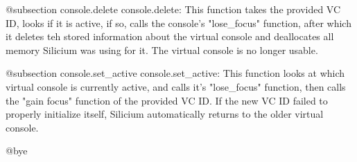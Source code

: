 @subsection console.delete
console.delete:
This function takes the provided VC ID, looks if it is active, if so, calls the
console's "lose_focus" function, after which it deletes teh stored information about the virtual console and deallocates all memory Silicium was using for it.
The virtual console is no longer usable.

@subsection console.set_active
console.set_active:
This function looks at which virtual console is currently active, and calls it's "lose_focus" function, then calls the "gain focus" function of the provided VC
ID.  If the new VC ID failed to properly initialize itself, Silicium automatically returns to the older virtual console.

@bye
